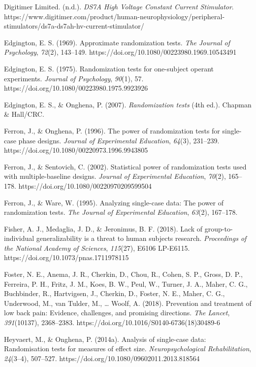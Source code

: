 \documentclass{article}
\begin{document}
Digitimer Limited. (n.d.). \emph{DS7A High Voltage Constant Current Stimulator}. https://www.digitimer.com/product/human-neurophysiology/peripheral-stimulators/ds7a-ds7ah-hv-current-stimulator/

Edgington, E. S. (1969). Approximate randomization tests. \emph{The Journal of Psychology}, \emph{72}(2), 143--149. https://doi.org/10.1080/00223980.1969.10543491

Edgington, E. S. (1975). Randomization tests for one-subject operant experiments. \emph{Journal of Psychology}, \emph{90}(1), 57. https://doi.org/10.1080/00223980.1975.9923926

Edgington, E. S., \& Onghena, P. (2007). \emph{Randomization tests} (4th ed.). Chapman \& Hall/CRC.

Ferron, J., \& Onghena, P. (1996). The power of randomization tests for single-case phase designs. \emph{Journal of Experimental Education}, \emph{64}(3), 231--239. https://doi.org/10.1080/00220973.1996.9943805

Ferron, J., \& Sentovich, C. (2002). Statistical power of randomization tests used with multiple-baseline designs. \emph{Journal of Experimental Education}, \emph{70}(2), 165--178. https://doi.org/10.1080/00220970209599504

Ferron, J., \& Ware, W. (1995). Analyzing single-case data: The power of randomization tests. \emph{The Journal of Experimental Education}, \emph{63}(2), 167--178.

Fisher, A. J., Medaglia, J. D., \& Jeronimus, B. F. (2018). Lack of group-to-individual generalizability is a threat to human subjects research. \emph{Proceedings of the National Academy of Sciences}, \emph{115}(27), E6106 LP-E6115. https://doi.org/10.1073/pnas.1711978115

Foster, N. E., Anema, J. R., Cherkin, D., Chou, R., Cohen, S. P., Gross, D. P., Ferreira, P. H., Fritz, J. M., Koes, B. W., Peul, W., Turner, J. A., Maher, C. G., Buchbinder, R., Hartvigsen, J., Cherkin, D., Foster, N. E., Maher, C. G., Underwood, M., van Tulder, M., … Woolf, A. (2018). Prevention and treatment of low back pain: Evidence, challenges, and promising directions. \emph{The Lancet}, \emph{391}(10137), 2368--2383. https://doi.org/10.1016/S0140-6736(18)30489-6

Heyvaert, M., \& Onghena, P. (2014a). Analysis of single-case data: Randomisation tests for measures of effect size. \emph{Neuropsychological Rehabilitation}, \emph{24}(3--4), 507--527. https://doi.org/10.1080/09602011.2013.818564
\end{document}

